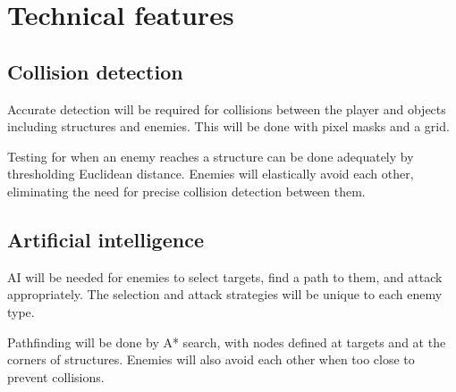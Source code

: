 \documentclass[a4paper]{article}
\begin{document}
\section{Technical features}

\subsection{Collision detection}

Accurate detection will be required for collisions between the player and objects including structures and enemies.  This will be done with pixel masks and a grid.

Testing for when an enemy reaches a structure can be done adequately by thresholding Euclidean distance.  Enemies will elastically avoid each other, eliminating the need for precise collision detection between them.

\subsection{Artificial intelligence}

AI will be needed for enemies to select targets, find a path to them, and attack appropriately.  The selection and attack strategies will be unique to each enemy type.

Pathfinding will be done by A* search, with nodes defined at targets and at the corners of structures.  Enemies will also avoid each other when too close to prevent collisions.
\end{document}
